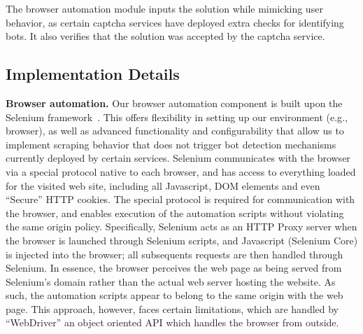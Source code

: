 \protect{} The browser automation module inputs the solution while mimicking 
user behavior, as certain captcha services have deployed extra checks for identifying bots.
It also verifies that the solution was accepted by the captcha service.

\subsection{Implementation Details}

\textbf{Browser automation.}
Our browser automation component is built upon the Selenium framework~\cite{selenium}. This offers
flexibility in setting up our environment (e.g., browser), as well as advanced functionality
and configurability that allow us to implement scraping behavior that does not trigger bot detection
mechanisms currently deployed by certain services.
Selenium communicates with the browser via a special protocol 
native to each browser, and has access to everything loaded for the visited web site, including all Javascript, DOM 
elements and even ``Secure'' HTTP cookies. The special protocol is required for communication with the browser,
and enables execution of the automation scripts without violating the same origin policy.
Specifically, Selenium acts as an HTTP Proxy server when
the browser is launched through Selenium scripts, and Javascript (Selenium Core) is injected into the browser;
all subsequents requests are then handled through Selenium. In essence, the browser perceives the
web page as being served from Selenium's domain rather than the actual web server hosting the website.
As such, the automation scripts appear to belong to the same origin with the web page. This approach, 
however, faces certain limitations, which are handled by ``WebDriver'' an object oriented API
which handles the browser from outside. 


